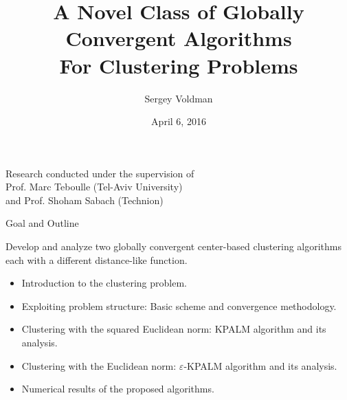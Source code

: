 \documentclass[9pt]{beamer}
\author[Sergey Voldman]{Sergey Voldman}
\newenvironment{displaybox}[1]
{
  \centerline\bgroup\hfill
  \begin{beamerboxesrounded}[lower=default,shadow=true,width=#1]{}
}
{
  \end{beamerboxesrounded}\hfill\egroup
}
\begin{document}
\title[Globally Convergent Algorithms for Clustering]{A Novel Class of Globally Convergent Algorithms \\ \vspace{0.1in} For Clustering Problems}
\date{April 6, 2016}

	\begin{frame}
		\titlepage
		\begin{center}
			Research conducted under the supervision of\\ \smallskip
			Prof. Marc Teboulle (Tel-Aviv University)\\ \smallskip
			and Prof. Shoham Sabach (Technion)
		\end{center}
	\end{frame}

    \begin{frame}{Goal and Outline}

    	\begin{displaybox}{10cm}
    		\begin{center}
				Develop and analyze two globally convergent center-based clustering algorithms each with a different distance-like function.	        
        	\end{center}
        \end{displaybox}

        \vspace{0.03in}
        \pause
        \begin{itemize}[<+->]
        	\item Introduction to the clustering problem. \vspace{0.15in}
        	\item Exploiting problem structure: Basic scheme and convergence methodology. \vspace{0.15in}
            \item Clustering with the squared Euclidean norm: KPALM algorithm and its analysis. \vspace{0.15in}
            \item Clustering with the Euclidean norm: $\varepsilon$-KPALM algorithm and its analysis. \vspace{0.15in}
            \item Numerical results of the proposed algorithms.
        \end{itemize}
    \end{frame}
\end{document}
